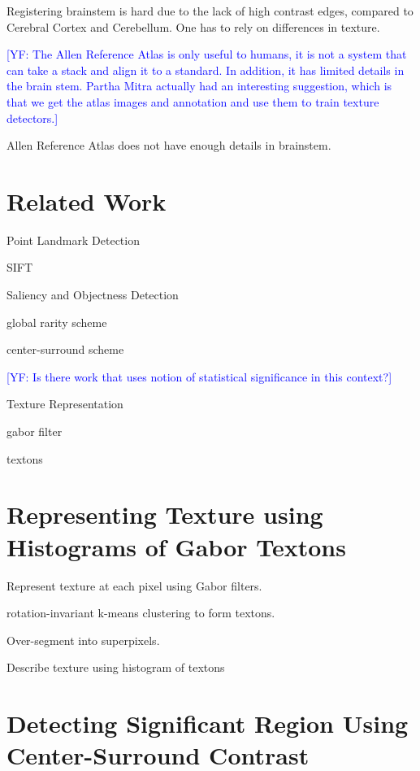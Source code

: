 \documentclass{llncs}
\newcommand{\authcmt}[2]{\textcolor{#1}{#2}}
\newcommand{\yoav}[1]{\authcmt{blue}{[YF: #1]}}
\begin{document}
Registering brainstem is hard due to the lack of high contrast edges,
compared to Cerebral Cortex and Cerebellum. One has to rely on
differences in texture.

\yoav{The Allen Reference Atlas is only useful to humans, it is not a
  system that can take a stack and align it to a standard. In
  addition, it has limited details in the brain stem. Partha Mitra
  actually had an interesting suggestion, which is that we get the
  atlas images and annotation and use them to train texture
  detectors.}

Allen Reference Atlas does not have enough details in brainstem.

\section{Related Work}

\begin{description}

\item{Point Landmark Detection}

SIFT

\item{Saliency and Objectness Detection}

global rarity scheme

center-surround scheme

\yoav{Is there work that uses notion of statistical significance in
  this context?}

\item{Texture Representation}

gabor filter

textons

\end{description}

\section{Representing Texture using Histograms of Gabor Textons}

Represent texture at each pixel using Gabor filters.

rotation-invariant k-means clustering to form textons.

Over-segment into superpixels.

Describe texture using histogram of textons

\section{Detecting Significant Region Using Center-Surround Contrast}
\end{document}

